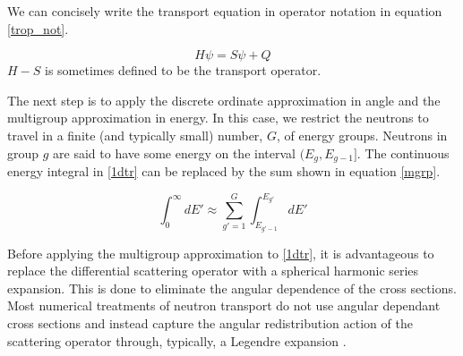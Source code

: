We can concisely write the transport equation in operator notation in equation \ref{trop_not}.

\begin{equation}
H\psi = S\psi + Q
\label{trop_not}
\end{equation}
$H-S$ is sometimes defined to be the transport operator.

The next step is to apply the discrete ordinate approximation in angle and the multigroup approximation in energy.  In this case, we restrict the neutrons to travel in a finite (and typically small) number, $G$, of energy groups.  Neutrons in group $g$ are said to have some energy on the interval $(E_g, E_{g-1}]$.  The continuous energy integral in \ref{1dtr} can
be replaced by the sum shown in equation \ref{mgrp}.

\begin{equation}
\int_0^\infty dE' \approx \sum_{g'=1}^G \int_{E_{g'-1}}^{E_{g'}} dE'
\label{mgrp}
\end{equation}

Before applying the multigroup approximation to \ref{1dtr}, it is advantageous to replace the differential scattering operator with a spherical harmonic series expansion. This is done to eliminate the angular dependence of the cross sections.  Most numerical treatments of neutron transport do not use angular dependant cross sections and instead capture the angular redistribution action of the scattering operator through, typically, a Legendre expansion \cite{Lewis}.  

